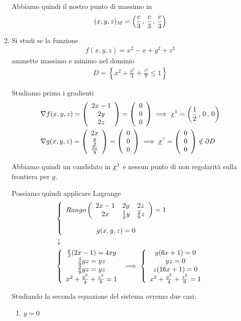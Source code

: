\begin{enumerate}
	Abbiamo quindi il nostro punto di massimo in
	\begin{align}
		(x,y,z)_M=\left(\frac{c}{3} \, , \, \frac{c}{3} \, , \, \frac{c}{3}\right)
	\end{align}
	
	\newpage
		
	\item Si studi se la funzione
	\begin{align}
		f(x,y,z)=x^2-x +y^2 + z^2 
	\end{align}
	ammette massimo e minimo nel dominio
	\begin{align}
		D = \left\{ x^2 + \frac{y^2}{4}+ \frac{z^2}{9}\leq 1 \right\}
	\end{align}
	
	Studiamo prima i gradienti
	\begin{align}
		{}&\nabla f(x,y,z)= \left( \begin{array}{cc} 2x-1 \\ 2y \\ 2z \end{array} \right)=\left( \begin{array}{cc} 0 \\ 0 \\ 0 \end{array} \right) \implies \underline{x}^1=\left(\frac{1}{2} \, , \, 0 \, , \, 0\right) \\
		&\nabla g(x,y,z)= \left( \begin{array}{cc} 2x \\ \frac{y}{2} \\ \frac{2z}{9} \end{array} \right) =\left( \begin{array}{cc} 0 \\ 0 \\ 0 \end{array} \right) \implies \underline{x}^?= \left( \begin{array}{cc} 0 \\ 0 \\ 0 \end{array} \right) \notin \partial D
	\end{align}
	
	Abbiamo quindi un candidato in $\underline{x}^1$ e nessun punto di non regolarità sulla frontiera per $g$.
	
	Possiamo quindi applicare Lagrange
	\begin{align}
		{}&\left\{\begin{array}{cc} Rango \left( \begin{array}{ccc} 2x-1 & 2y & 2z\\ 2x & \frac{1}{2} y & \frac{2}{9}z\\ \end{array} \right) =1 \\ \quad \\ g(x,y,z)=0 \end{array}\right. \nonumber \\ &\downarrow \nonumber \\
		&\left\{\begin{array}{cc} \frac{y}{2} (2x-1) = 4xy  \\  \frac{4}{9} yz = yz   \\ \frac{2}{9}yz = yz  \\  x^2 + \frac{y^2}{4}+ \frac{z^2}{9}= 1 \end{array}\right.\implies 
		\left\{\begin{array}{cc} y(6x+1)=0 \\ yz=0 \\ z(16x + 1)=0 \\ x^2 + \frac{y^2}{4}+ \frac{z^2}{9}= 1 \end{array}\right.
	\end{align}	
	
	Studiando la seconda equazione del sistema avremo due casi: 
	\begin{enumerate}
		\item $y=0$
		

\end{enumerate}
\end{enumerate}
